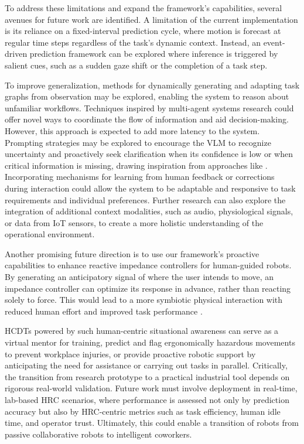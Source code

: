\documentclass[biomimetics,article,submit,pdftex,moreauthors]{Definitions/mdpi}
\begin{document}
To address these limitations and expand the framework's capabilities, several avenues for future work are identified. A limitation of the current implementation is its reliance on a fixed-interval prediction cycle, where motion is forecast at regular time steps regardless of the task's dynamic context. Instead, an event-driven prediction framework can be explored where inference is triggered by salient cues, such as a sudden gaze shift or the completion of a task step. 

To improve generalization, methods for dynamically generating and adapting task graphs from observation may be explored, enabling the system to reason about unfamiliar workflows. Techniques inspired by multi-agent systems research \citep{magentic} could offer novel ways to coordinate the flow of information and aid decision-making. However, this approach is expected to add more latency to the system. Prompting strategies may be explored to encourage the VLM to recognize uncertainty and proactively seek clarification when its confidence is low or when critical information is missing, drawing inspiration from approaches like \citep{Chen2023}. Incorporating mechanisms for learning from human feedback or corrections during interaction \citep{Abeyruwan2022} could allow the system to be adaptable and responsive to task requirements and individual preferences. Further research can also explore the integration of additional context modalities, such as audio, physiological signals, or data from IoT sensors, to create a more holistic understanding of the operational environment. 

Another promising future direction is to use our framework’s proactive capabilities to enhance reactive impedance controllers for human-guided robots. By generating an anticipatory signal of where the user intends to move, an impedance controller can optimize its response in advance, rather than reacting solely to force. This would lead to a more symbiotic physical interaction with reduced human effort and improved task performance \citep{ImpedanceLearning}.

HCDTs powered by such human-centric situational awareness can serve as a virtual mentor for training, predict and flag ergonomically hazardous movements to prevent workplace injuries, or provide proactive robotic support by anticipating the need for assistance or carrying out tasks in parallel. Critically, the transition from research prototype to a practical industrial tool depends on rigorous real-world validation. Future work must involve deployment in real-time, lab-based HRC scenarios, where performance is assessed not only by prediction accuracy but also by HRC-centric metrics such as task efficiency, human idle time, and operator trust. Ultimately, this could enable a transition of robots from passive collaborative robots to intelligent coworkers.  
\end{document}

